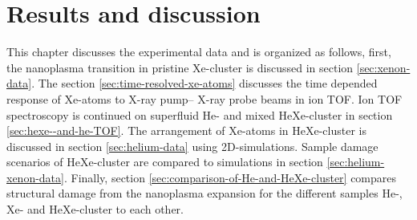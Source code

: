 \chapter{Results and discussion}\label{ch:results}
This chapter discusses the experimental data and is organized as follows, first, the nanoplasma transition in pristine Xe-cluster is discussed in section \ref{sec:xenon-data}. The section \ref{sec:time-resolved-xe-atoms} discusses the time depended response of Xe-atoms to X-ray pump-- X-ray probe beams in ion TOF. Ion TOF spectroscopy is continued on superfluid He- and mixed HeXe-cluster in section \ref{sec:hexe--and-he-TOF}. The arrangement of Xe-atoms in HeXe-cluster is discussed in section \ref{sec:helium-data} using 2D-simulations. Sample damage scenarios of HeXe-cluster are compared to simulations in section \ref{sec:helium-xenon-data}. Finally, section \ref{sec:comparison-of-He-and-HeXe-cluster} compares structural damage from the nanoplasma expansion for the different samples He-, Xe- and HeXe-cluster to each other.
%
%
%
